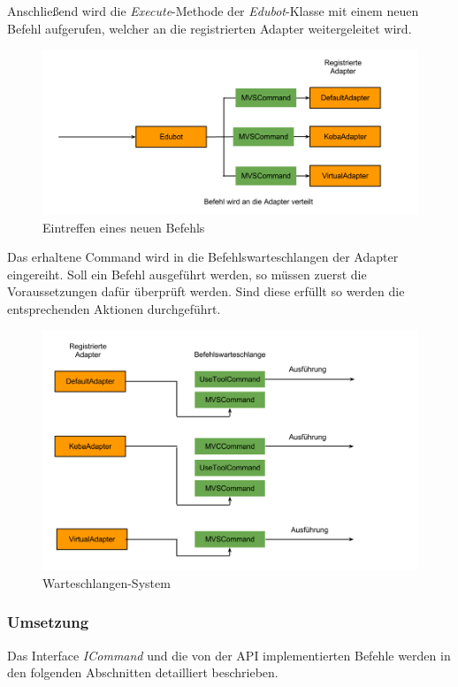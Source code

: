 Anschließend wird die \textit{Execute}-Methode der \textit{Edubot}-Klasse mit einem neuen Befehl aufgerufen, welcher an die registrierten Adapter weitergeleitet wird.
\begin{figure}[H]
  \centering
  \begin{minipage}[t]{12 cm}
  	\centering
  	\includegraphics[width=12cm]{images/CommandSystem2} 
    \caption{Eintreffen eines neuen Befehls}
  \end{minipage}
\end{figure}
Das erhaltene Command wird in die Befehlswarteschlangen der Adapter eingereiht. Soll ein Befehl ausgeführt werden, so müssen zuerst die Voraussetzungen dafür überprüft werden. Sind diese erfüllt so werden die entsprechenden Aktionen durchgeführt.
\begin{figure}[H]
  \centering
  \begin{minipage}[t]{12 cm}
  	\centering
  	\includegraphics[width=12cm]{images/CommandSystem3} 
    \caption{Warteschlangen-System}
  \end{minipage}
\end{figure}

\subsubsection{Umsetzung}
Das Interface \textit{ICommand} und die von der API implementierten Befehle werden in den folgenden Abschnitten detailliert beschrieben.

